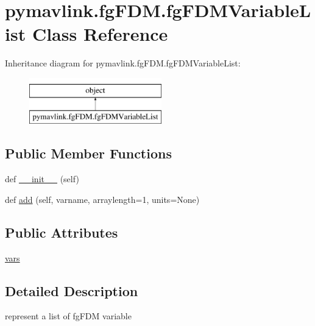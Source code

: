\hypertarget{classpymavlink_1_1fgFDM_1_1fgFDMVariableList}{}\section{pymavlink.\+fg\+F\+D\+M.\+fg\+F\+D\+M\+Variable\+List Class Reference}
\label{classpymavlink_1_1fgFDM_1_1fgFDMVariableList}
Inheritance diagram for pymavlink.\+fg\+F\+D\+M.\+fg\+F\+D\+M\+Variable\+List\+:\begin{figure}[H]
\begin{center}
\leavevmode
\includegraphics[height=2.000000cm]{classpymavlink_1_1fgFDM_1_1fgFDMVariableList}
\end{center}
\end{figure}
\subsection*{Public Member Functions}
\begin{DoxyCompactItemize}
\item 
def \mbox{\hyperlink{classpymavlink_1_1fgFDM_1_1fgFDMVariableList_a99f6215e97c021f81f6b98889e9a1dc6}{\+\_\+\+\_\+init\+\_\+\+\_\+}} (self)
\item 
def \mbox{\hyperlink{classpymavlink_1_1fgFDM_1_1fgFDMVariableList_a1bc0fcbbced32379e9a56d792e9d9807}{add}} (self, varname, arraylength=1, units=None)
\end{DoxyCompactItemize}
\subsection*{Public Attributes}
\begin{DoxyCompactItemize}
\item 
\mbox{\hyperlink{classpymavlink_1_1fgFDM_1_1fgFDMVariableList_a6c727c14aa93c3f24e8af01ed41ff4af}{vars}}
\end{DoxyCompactItemize}


\subsection{Detailed Description}
\begin{DoxyVerb}represent a list of fgFDM variable\end{DoxyVerb}
 

